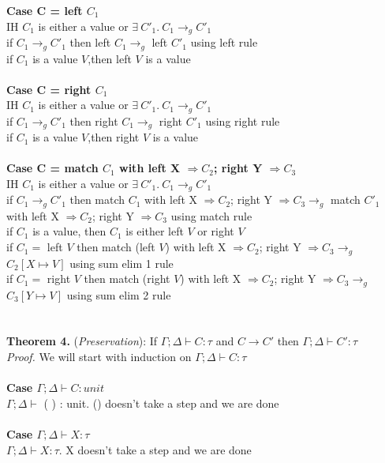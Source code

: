 \documentclass{article}
\begin{document}
\textbf{Case C = left $C_1$} \\
IH $C_1$ is either a value or $  \exists \ C'_1.\ C_1 \to_g C'_1 $ \\
if $C_1 \to_g C'_1$ then left $C_1 \to_g$ left $C'_1$ using left rule\\
if $C_1$ is a value $V$,then left $V$ is a value\\ \\
\textbf{Case C = right $C_1$} \\
IH $C_1$ is either a value or $  \exists \ C'_1.\ C_1 \to_g C'_1 $ \\
if $C_1 \to_g C'_1$ then right $C_1 \to_g$ right $C'_1$ using right rule\\
if $C_1$ is a value $V$,then right $V$ is a value\\ \\
\textbf{Case C = match $C_1$ with left X $\Rightarrow C_2$; right Y $\Rightarrow C_3$}\\
IH $C_1$ is either a value or $  \exists \ C'_1.\ C_1 \to_g C'_1 $ \\
if $C_1 \to_g C'_1$ then match $C_1$ with left X $\Rightarrow C_2$; right Y $\Rightarrow C_3 \to_g$ match $C'_1$ with left X $\Rightarrow C_2$; right Y $\Rightarrow C_3$ using match rule\\
if $C_1$ is a value, then $C_1$ is either left $V$ or right $V$\\
if $C_1 = $ left $V$ then match (left $V$) with left X $\Rightarrow C_2$; right Y $\Rightarrow C_3 \to_g$ $C_2[X \mapsto V]$ using sum elim 1 rule\\
if $C_1 = $ right $V$ then match (right $V$) with left X $\Rightarrow C_2$; right Y $\Rightarrow C_3 \to_g$ $C_3[Y \mapsto V]$ using sum elim 2 rule\\
\\
\\
\textbf{Theorem 4.} (\textit{Preservation}): If $\Gamma;\Delta \vdash C : \tau$ and  $C \to C'$ then $\Gamma;\Delta \vdash C' : \tau$
  \\
\textit{Proof.} We will start with induction on $\Gamma;\Delta \vdash C : \tau$ \\ \\
\textbf{Case $\Gamma; \Delta \vdash C : unit$} \\
 $\Gamma; \Delta \vdash $ ( ) : unit. () doesn't take a step and we are done \\ \\
\textbf{Case $\Gamma; \Delta \vdash X : \tau$}       \\ 
$\Gamma; \Delta \vdash X : \tau$. X doesn't take a step and we are done \\ \\
\end{document}
